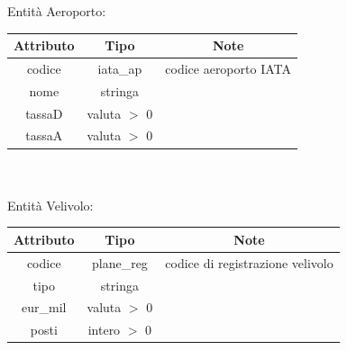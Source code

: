 \documentclass[a4paper,12pt]{report}
\begin{document}
      Entità Aeroporto: \\
      \begin{tabular}{|c|c|c|}
        \hline Attributo & Tipo & Note \\
        \hline codice & iata\_ap & codice aeroporto IATA \\
        \hline nome & stringa & \\
        \hline tassaD & valuta $>$ 0 & \\
        \hline tassaA & valuta $>$ 0 & \\
        \hline
      \end{tabular} \\ \\
      Entità Velivolo: \\
      \begin{tabular}{|c|c|c|}
        \hline Attributo & Tipo & Note \\
        \hline codice & plane\_reg & codice di registrazione velivolo \\
        \hline tipo & stringa & \\
        \hline eur\_mil & valuta $>$ 0 & \\
        \hline posti & intero $>$ 0 & \\
        \hline
      \end{tabular} \\ \\

      \newpage
\end{document}
